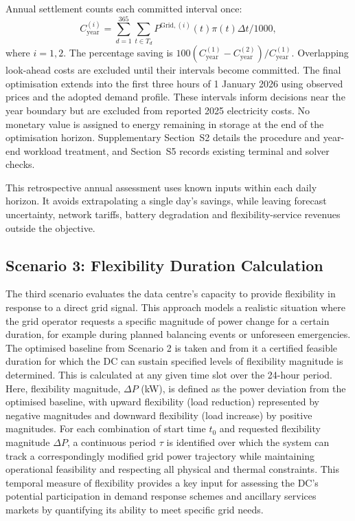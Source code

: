 \documentclass[lettersize,journal]{IEEEtran}
\begin{document}
Annual settlement counts each committed interval once:
\begin{equation}
C^{(i)}_{\mathrm{year}}=\sum_{d=1}^{365}\sum_{t\in T_d}P^{\mathrm{Grid},(i)}(t)\pi(t)\Delta t/1000,
\label{eq:annual-cost}
\end{equation}
where $i=1,2$. The percentage saving is $100(C^{(1)}_{\mathrm{year}}-C^{(2)}_{\mathrm{year}})/C^{(1)}_{\mathrm{year}}$. Overlapping look-ahead costs are excluded until their intervals become committed. The final optimisation extends into the first three hours of 1 January 2026 using observed prices and the adopted demand profile. These intervals inform decisions near the year boundary but are excluded from reported 2025 electricity costs. No monetary value is assigned to energy remaining in storage at the end of the optimisation horizon. Supplementary Section~S2 details the procedure and year-end workload treatment, and Section~S5 records existing terminal and solver checks.

This retrospective annual assessment uses known inputs within each daily horizon. It avoids extrapolating a single day's savings, while leaving forecast uncertainty, network tariffs, battery degradation and flexibility-service revenues outside the objective.


\subsection{Scenario 3: Flexibility Duration Calculation}\label{sec:scenario 3}
The third scenario evaluates the data centre's capacity to provide flexibility in response to a direct grid signal. This approach models a realistic situation where the grid operator requests a specific magnitude of power change for a certain duration, for example during planned balancing events or unforeseen emergencies. The optimised baseline from Scenario 2 is taken and from it a certified feasible duration for which the DC can sustain specified levels of flexibility magnitude is determined. This is calculated at any given time slot over the 24-hour period. Here, flexibility magnitude, $\Delta P$ (kW), is defined as the power deviation from the optimised baseline, with upward flexibility (load reduction) represented by negative magnitudes and downward flexibility (load increase) by positive magnitudes. For each combination of start time $t_0$ and requested flexibility magnitude $\Delta P$, a continuous period $\tau$ is identified over which the system can track a correspondingly modified grid power trajectory while maintaining operational feasibility and respecting all physical and thermal constraints. This temporal measure of flexibility provides a key input for assessing the DC's potential participation in demand response schemes and ancillary services markets by quantifying its ability to meet specific grid needs.
\end{document}
